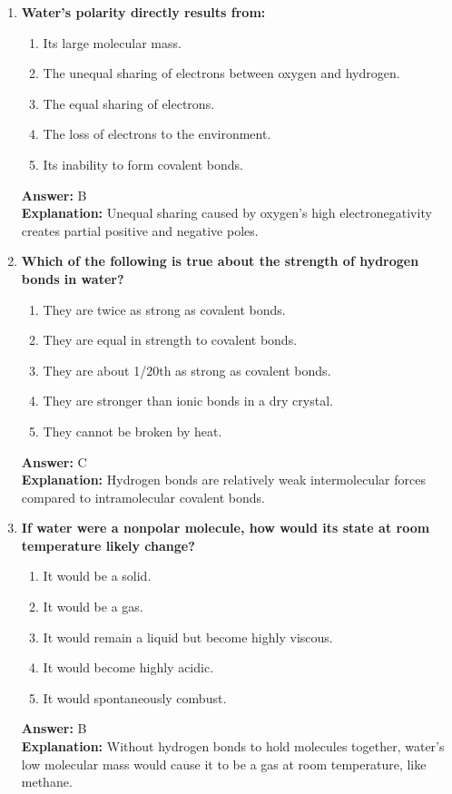 \documentclass[11pt, a4paper]{article}
\begin{document}
\begin{enumerate}
\item \textbf{Water's polarity directly results from:}
\begin{enumerate}[label=\Alph*.]
    \item Its large molecular mass.
    \item The unequal sharing of electrons between oxygen and hydrogen.
    \item The equal sharing of electrons.
    \item The loss of electrons to the environment.
    \item Its inability to form covalent bonds.
\end{enumerate}
\textbf{Answer:} B \\
\textbf{Explanation:} Unequal sharing caused by oxygen's high electronegativity creates partial positive and negative poles.

\item \textbf{Which of the following is true about the strength of hydrogen bonds in water?}
\begin{enumerate}[label=\Alph*.]
    \item They are twice as strong as covalent bonds.
    \item They are equal in strength to covalent bonds.
    \item They are about 1/20th as strong as covalent bonds.
    \item They are stronger than ionic bonds in a dry crystal.
    \item They cannot be broken by heat.
\end{enumerate}
\textbf{Answer:} C \\
\textbf{Explanation:} Hydrogen bonds are relatively weak intermolecular forces compared to intramolecular covalent bonds.

\item \textbf{If water were a nonpolar molecule, how would its state at room temperature likely change?}
\begin{enumerate}[label=\Alph*.]
    \item It would be a solid.
    \item It would be a gas.
    \item It would remain a liquid but become highly viscous.
    \item It would become highly acidic.
    \item It would spontaneously combust.
\end{enumerate}
\textbf{Answer:} B \\
\textbf{Explanation:} Without hydrogen bonds to hold molecules together, water's low molecular mass would cause it to be a gas at room temperature, like methane.


\end{enumerate}
\end{document}
